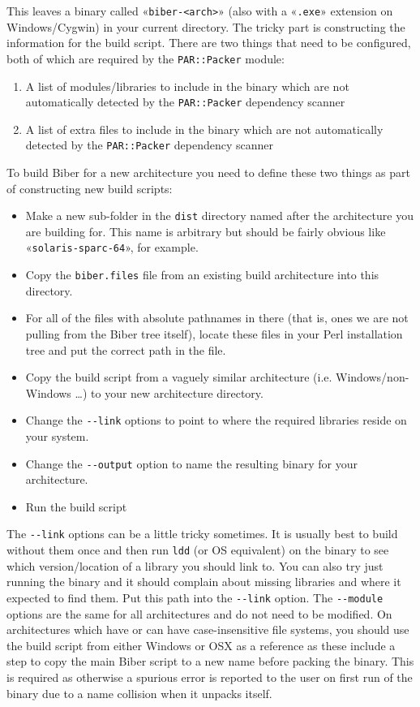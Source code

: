 \documentclass{ltxdockit}
\begin{document}
\noindent This leaves a binary called «\verb+biber-<arch>+» (also with
a «\verb+.exe+» extension on Windows/Cygwin) in your current directory.
The tricky part is constructing the information for the build
script. There are two things that need to be configured, both of
which are required by the \verb+PAR::Packer+ module:

\begin{enumerate}
\item A list of modules/libraries to include in the binary which are not
  automatically detected by the \verb+PAR::Packer+ dependency
  scanner
\item A list of extra files to include in the binary which are not
  automatically detected by the \verb+PAR::Packer+ dependency
  scanner
\end{enumerate}

\noindent To build Biber for a new architecture you need to
define these two things as part of constructing new build scripts:

\begin{itemize}
\item Make a new sub-folder in the \verb+dist+ directory named after the
  architecture you are building for. This name is arbitrary but should
  be fairly obvious like «\verb+solaris-sparc-64+», for example.
\item Copy the \verb+biber.files+ file from an existing build
  architecture into this directory.
\item For all of the files with absolute pathnames in there (that is,
  ones we are not pulling from the Biber tree itself), locate these
  files in your Perl installation tree and put the correct path in the
  file.
\item Copy the build script from a vaguely similar architecture
  (i.e. Windows/non-Windows \ldots) to your new architecture
  directory. 
\item Change the \verb+--link+ options to point to where the required
  libraries reside on your system.
\item Change the \verb+--output+ option to name the resulting binary
  for your architecture.
\item Run the build script
\end{itemize}

\noindent The \verb+--link+ options can be a little tricky
sometimes. It is usually best to build without them once and then run
\verb+ldd+ (or OS equivalent) on the binary to see which
version/location of a library you should link to. You can also try
just running the binary and it should complain about missing libraries
and where it expected to find them. Put this path into the
\verb+--link+ option. The \verb+--module+ options are the same for all
architectures and do not need to be modified.
On architectures which have or can have case-insensitive file systems,
you should use the build script from either Windows or OSX as a reference
as these include a step to copy the main Biber script to a new name
before packing the binary. This is required as otherwise a spurious
error is reported to the user on first run of the binary due to a name
collision when it unpacks itself.
\end{document}

